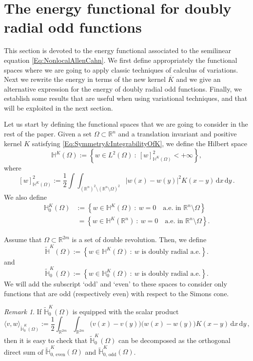 \documentclass[12pt,reqno]{amsart}
\theoremstyle{definition}
\theoremstyle{remark}
\newtheorem{remark}[theorem]{Remark}
\newcommand{\con}[1]{\mathbb{#1}}
\newcommand{\R}{\con{R}} %
\renewcommand{\H}{\con{H}}
\renewcommand{\d}{\,\mathrm{d}} %
\newcommand{\setcond}[2]{\left \{ #1 \ : \ #2  \right \}}
\numberwithin{equation}{section}
\begin{document}
\section{The energy functional for doubly radial odd functions}
\label{Sec:EnergyForOddF}


This section is devoted to the energy functional associated to the semilinear equation \eqref{Eq:NonlocalAllenCahn}. We first define appropriately the functional spaces where we are going to apply classic techniques of calculus of variations. Next we rewrite the energy in terms of the new kernel $\overline{K}$ and we give an alternative expression for the energy of doubly radial odd functions. Finally, we establish some results that are useful when using variational techniques, and that will be exploited in the next section.


Let us start by defining the functional spaces that we are going to consider in the rest of the paper. Given a set $\Omega \subset \R^n$ and a translation invariant and positive kernel $K$ satisfying \eqref{Eq:Symmetry&IntegrabilityOfK}, we define the Hilbert space
$$
\H^K(\Omega) := \setcond{w \in L^2(\Omega)}{[w]^2_{\H^K(\Omega)} < + \infty},
$$
where
$$
[w]^2_{\H^K(\Omega)} := \dfrac{1}{2}\int\int_{(\R^{n})^2 \setminus (\R^n\setminus\Omega)^2} |w(x) - w(y)|^2 K(x-y) \d x \d y\,.
$$
We also define
\begin{align*}
\H^K_0(\Omega) &:= \setcond{w \in \H^K(\Omega)}{ w = 0 \quad \textrm{a.e. in } \R^n \setminus \Omega} \\
&\ = \setcond{w \in \H^K(\R^n)}{ w = 0 \quad \textrm{a.e. in } \R^n \setminus \Omega}.
\end{align*}

Assume that $\Omega \subset \R^{2m}$ is a set of double revolution. Then, we define
$$
\widetilde{\H}^K(\Omega) := \setcond{w \in \H^K(\Omega)}{w \textrm{ is doubly radial a.e.}}.
$$
and
$$
\widetilde{\H}^K_0(\Omega) := \setcond{w \in \H^K_0(\Omega)}{w \textrm{ is doubly radial a.e.}}.
$$
We will add the subscript `odd' and `even' to these spaces to consider only functions that are odd (respectively even) with respect to the Simons cone.


\begin{remark}
	\label{Remark:DecompositionHK}
	If $\widetilde{\H}^K_0(\Omega)$ is equipped with the scalar product
	$$
	\langle v,w \rangle_{\widetilde{\H}^K_0(\Omega)} := \dfrac{1}{2}\int_{\R^{2m}} \int_{\R^{2m}}  \big(v(x) - v(y)\big)\big(w(x) - w(y)\big) K(x-y) \d x \d y\,,
	$$
	then it is easy to check that $\widetilde{\H}^K_0(\Omega)$ can be decomposed as the orthogonal direct sum of $\widetilde{\H}^K_{0,\, \mathrm{even}}(\Omega)$ and $\widetilde{\H}^K_{0,\,\mathrm{odd}}(\Omega)$.
\end{remark}
\end{document}
